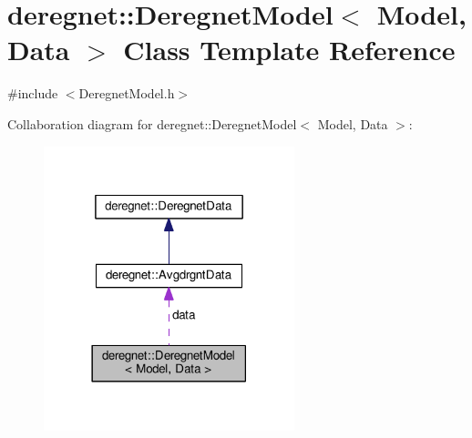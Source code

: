 \hypertarget{classderegnet_1_1DeregnetModel}{}\section{deregnet\+:\+:Deregnet\+Model$<$ Model, Data $>$ Class Template Reference}
\label{classderegnet_1_1DeregnetModel}


{\ttfamily \#include $<$Deregnet\+Model.\+h$>$}



Collaboration diagram for deregnet\+:\+:Deregnet\+Model$<$ Model, Data $>$\+:\nopagebreak
\begin{figure}[H]
\begin{center}
\leavevmode
\includegraphics[width=206pt]{classderegnet_1_1DeregnetModel__coll__graph}
\end{center}
\end{figure}
